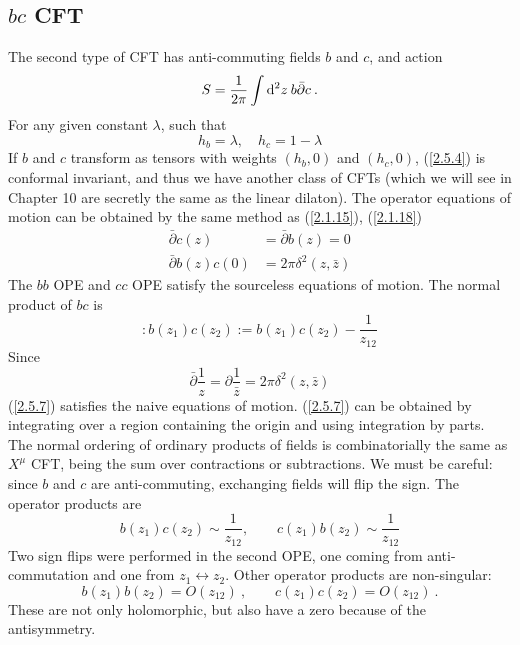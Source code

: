 \subsection*{$bc$ CFT}
The second type of CFT has anti-commuting fields $b$ and $c$, and action    
\begin{equation}\label{2.5.4}
	S=\frac{1}{2 \pi} \int \mathrm{d}^{2} z\:  b \bar{\partial} c \:.
\end{equation}
For any given constant $\lambda$, such that    
\begin{equation}
	h_{b}=\lambda, \quad h_{c}=1-\lambda
\end{equation}
If $b$ and $c$ transform as tensors with weights $(h_{b}, 0)$ and $(h_{c}, 0)$, (\ref{2.5.4}) is conformal invariant, and thus we have another class of CFTs (which we will see in Chapter 10 are secretly the same as the linear dilaton).    
The operator equations of motion can be obtained by the same method as (\ref{2.1.15}), (\ref{2.1.18})    
\begin{subequations} \label{2.5.6}
	\begin{align}
		\bar{\partial} c(z) &=\bar{\partial} b(z)=0  \label{2.5.6a} \\
		\bar{\partial} b(z) c(0) &=2 \pi \delta^{2}(z, \bar{z})  \label{2.5.6b} 
	\end{align}
\end{subequations}
The $bb$ OPE and $cc$ OPE satisfy the sourceless equations of motion.    
The normal product of $bc$ is    
\begin{equation}\label{2.5.7}
	: \mathrel{b(z_{1}) c(z_{2})}:=b(z_{1}) c(z_{2})-\frac{1}{z_{12}}
\end{equation}
Since    
\begin{equation}
	\bar{\partial} \frac{1}{z}=\partial \frac{1}{\bar{z}}=2 \pi \delta^{2}(z, \bar{z})
\end{equation}
(\ref{2.5.7}) satisfies the naive equations of motion. (\ref{2.5.7}) can be obtained by integrating over a region containing the origin and using integration by parts. The normal ordering of ordinary products of fields is combinatorially the same as $X^\mu$ CFT, being the sum over contractions or subtractions.    
We must be careful: since $b$ and $c$ are anti-commuting, exchanging fields will flip the sign.    
The operator products are    
\begin{equation}
	b(z_{1}) c(z_{2}) \sim \frac{1}{z_{12}}, \qquad c(z_{1}) b(z_{2}) \sim \frac{1}{z_{12}}
\end{equation}
Two sign flips were performed in the second OPE, one coming from anti-commutation and one from $z_{1} \leftrightarrow z_{2}$. Other operator products are non-singular:    
\begin{equation}
	b(z_{1}) b(z_{2})=O(z_{12}) \:, \qquad c(z_{1}) c(z_{2})=O(z_{12}) \:.
\end{equation}
These are not only holomorphic, but also have a zero because of the antisymmetry.    

